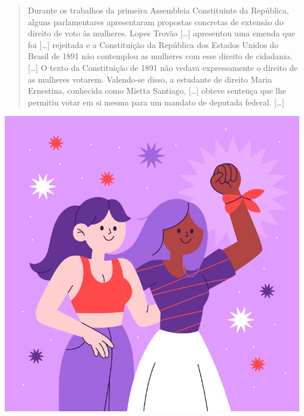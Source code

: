 \begin{minipage}{.5\textwidth}
\begin{quote}
Durante os trabalhos da primeira Assembleia Constituinte da República,
alguns parlamentares apresentaram propostas concretas de extensão do
direito de voto às mulheres. Lopes Trovão {[}\ldots{}{]}
 apresentou uma emenda que foi
{[}\ldots{}{]} rejeitada e a Constituição da República dos Estados Unidos do
Brasil de 1891 não contemplou as mulheres com esse direito de cidadania. {[}\ldots{}{]}
O texto da Constituição de 1891 não vedava expressamente o
direito de as mulheres votarem. Valendo-se disso, a estudante de direito
Maria Ernestina, conhecida como Mietta Santiago, {[}\ldots{}{]} obteve sentença
que lhe permitiu votar em si mesma para um mandato de deputada federal. {[}\ldots{}{]}
\end{quote}
\end{minipage}\hspace{.5cm}
\begin{minipage}{.5\textwidth}
\includegraphics[width=\textwidth]{./imgs/img49.png}
\end{minipage}

